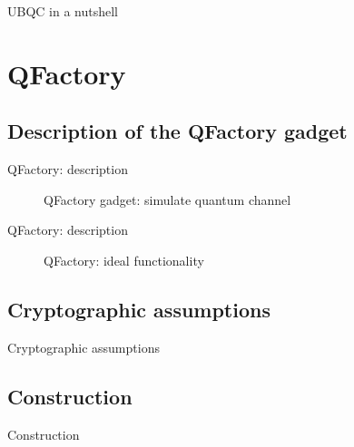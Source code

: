 \documentclass[]{beamer}
\begin{document}
\begin{frame}{UBQC in a nutshell}
  \begin{figure}[ht]
    \centering
  \end{figure}
\end{frame}

\section{QFactory}

\subsection{Description of the QFactory gadget}

\begin{frame}{QFactory: description}
  \begin{figure}[ht]
    \centering
    \caption{QFactory gadget: simulate quantum channel}
  \end{figure}
\end{frame}


\begin{frame}{QFactory: description}
  \begin{figure}[ht]
    \centering
    \caption{QFactory: ideal functionality}
  \end{figure}
\end{frame}

\subsection{Cryptographic assumptions}

\begin{frame}{Cryptographic assumptions}
  \begin{figure}[ht]
    \centering
  \end{figure}
\end{frame}

\subsection{Construction}

\begin{frame}[t]{Construction}%
  \vspace{-4mm}%
  \begin{columns}
    \column{\dimexpr\paperwidth-10pt}
    \begin{figure}[ht]
      \centering
    \end{figure}
  \end{columns}
\end{frame}
\end{document}
